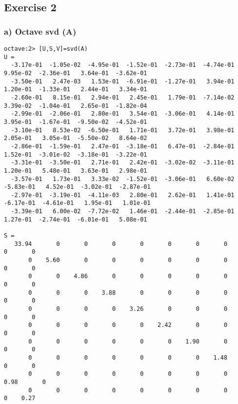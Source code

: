 \documentclass{article}
\begin{document}
\begin{landscape}
\section*{Exercise 2}
\subsubsection*{a) Octave svd (A)} 	
\begin{lstlisting}[frame=single,basicstyle=\scriptsize]
octave:2> [U,S,V]=svd(A)
U =
  -3.17e-01  -1.05e-02  -4.95e-01  -1.52e-01  -2.73e-01  -4.74e-01   9.95e-02  -2.36e-01   3.64e-01  -3.62e-01
  -3.50e-01   2.47e-03   1.53e-01  -6.91e-01  -1.27e-01   3.94e-01   1.20e-01  -1.33e-01   2.44e-01   3.34e-01
  -2.60e-01   8.15e-01   2.94e-01   2.45e-01   1.79e-01  -7.14e-02   3.39e-02  -1.04e-01   2.65e-01  -1.82e-04
  -2.99e-01  -2.06e-01   2.80e-01   3.54e-01  -3.06e-01   4.14e-01   3.95e-01  -1.67e-01  -9.50e-02  -4.52e-01
  -3.10e-01   8.53e-02  -6.50e-01   1.71e-01   3.72e-01   3.98e-01   2.05e-01   3.05e-01  -5.50e-02   8.64e-02
  -2.86e-01  -1.59e-01   2.47e-01  -3.18e-01   6.47e-01  -2.84e-01   1.52e-01  -3.01e-02  -3.18e-01  -3.22e-01
  -3.31e-01  -3.50e-01   2.71e-01   2.42e-01  -3.02e-02  -3.11e-01   1.20e-01   5.48e-01   3.63e-01   2.98e-01
  -3.57e-01   1.73e-01   3.33e-02  -1.52e-01  -3.06e-01   6.60e-02  -5.83e-01   4.52e-01  -3.02e-01  -2.87e-01
  -2.97e-01  -3.19e-01  -4.11e-03   2.80e-01   2.62e-01   1.41e-01  -6.17e-01  -4.61e-01   1.95e-01   1.01e-01
  -3.39e-01   6.00e-02  -7.72e-02   1.46e-01  -2.44e-01  -2.85e-01   1.27e-01  -2.74e-01  -6.01e-01   5.08e-01

S =
   33.94       0       0       0       0       0       0       0       0       0
       0    5.60       0       0       0       0       0       0       0       0
       0       0    4.86       0       0       0       0       0       0       0
       0       0       0    3.88       0       0       0       0       0       0
       0       0       0       0    3.26       0       0       0       0       0
       0       0       0       0       0    2.42       0       0       0       0
       0       0       0       0       0       0    1.90       0       0       0
       0       0       0       0       0       0       0    1.48       0       0
       0       0       0       0       0       0       0       0    0.98       0
       0       0       0       0       0       0       0       0       0    0.27


\end{lstlisting}
\end{landscape}
\end{document}
